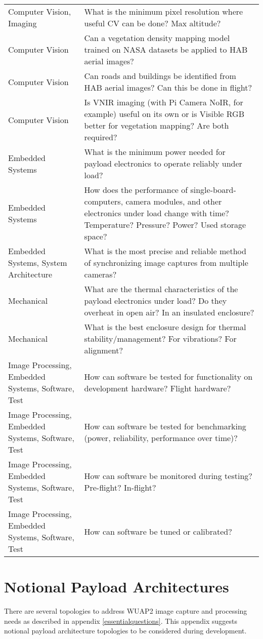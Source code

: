 \documentclass[conference]{IEEEtran} %
\begin{document}
\begin{table}[h!]
\begin{tabularx}{\linewidth}{@{}p{}X@{}}
    Computer Vision, Imaging & What is the minimum pixel resolution where useful CV can be done? Max altitude? \\
    Computer Vision & Can a vegetation density mapping model trained on NASA datasets be applied to HAB aerial images? \\
    Computer Vision & Can roads and buildings be identified from HAB aerial images? Can this be done in flight? \\
    Computer Vision & Is VNIR imaging (with Pi Camera NoIR, for example) useful on its own or is Visible RGB better for vegetation mapping? Are both required? \\
    Embedded Systems & What is the minimum power needed for payload electronics to operate reliably under load? \\
    Embedded Systems & How does the performance of single-board-computers, camera modules, and other electronics under load change with time? Temperature? Pressure? Power? Used storage space? \\
    Embedded Systems, System Architecture & What is the most precise and reliable method of synchronizing image captures from multiple cameras? \\
    Mechanical & What are the thermal characteristics of the payload electronics under load? Do they overheat in open air? In an insulated enclosure? \\
    Mechanical & What is the best enclosure design for thermal stability/management? For vibrations? For alignment? \\
    Image Processing, Embedded Systems, Software, Test & How can software be tested for functionality on development hardware? Flight hardware? \\
    Image Processing, Embedded Systems, Software, Test & How can software be tested for benchmarking (power, reliability, performance over time)? \\
    Image Processing, Embedded Systems, Software, Test & How can software be monitored during testing? Pre-flight? In-flight? \\
    Image Processing, Embedded Systems, Software, Test & How can software be tuned or calibrated? \\
\end{tabularx}
\end{table}

\section{Notional Payload Architectures}
\label{architectures}
There are several topologies to address WUAP2 image capture and processing needs as described in appendix \ref{essentialquestions}.
This appendix suggests notional payload architecture topologies to be considered during development.
\end{document}
